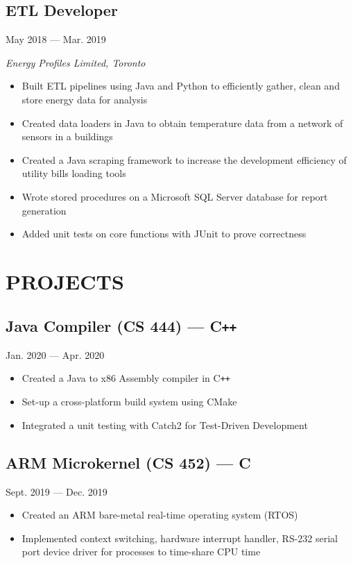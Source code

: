 \documentclass[11pt]{extarticle}
\newcommand{\resumeSub}[2]{
\subsection*{#1} \hfill {#2}
}
\begin{document}
\resumeSub{ETL Developer}{May 2018 --- Mar. 2019}

\textit{Energy Profiles Limited, Toronto}
\begin{itemize}
  \item Built ETL pipelines using Java and Python to efficiently gather, clean and store energy data for analysis
  \item Created data loaders in Java to obtain temperature data from a network of sensors in a buildings
  \item Created a Java scraping framework to increase the development efficiency of utility bills loading tools
  \item Wrote stored procedures on a Microsoft SQL Server database for report generation
  \item Added unit tests on core functions with JUnit to prove correctness
\end{itemize}

\section*{PROJECTS}
\subsection*{Java Compiler (CS 444) --- C\texttt{++}} \hfill Jan. 2020 --- Apr. 2020

\begin{itemize}
  \item Created a Java to x86 Assembly compiler in C\texttt{++}
  \item Set-up a cross-platform build system using CMake
  \item Integrated a unit testing with Catch2 for Test-Driven Development
\end{itemize}

\subsection*{ARM Microkernel (CS 452) --- C} \hfill Sept. 2019 --- Dec. 2019
\begin{itemize}
  \item Created an ARM bare-metal real-time operating system (RTOS)
  \item Implemented context switching, hardware interrupt handler, RS-232 serial port device driver for processes to time-share CPU time
    \end{itemize}
\end{document}
